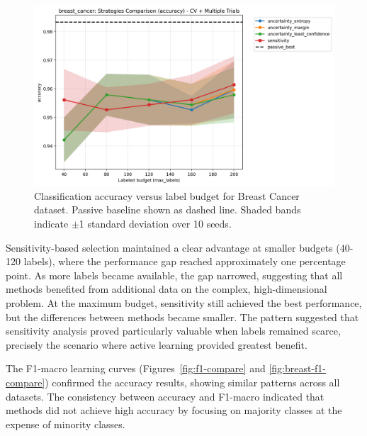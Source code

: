 \documentclass[conference]{IEEEtran}
\begin{document}
\begin{figure}[t]
\centering
\includegraphics[width=0.95\columnwidth]{figures/cls_breast_cancer_comparison_accuracy.png}
\caption{Classification accuracy versus label budget for Breast Cancer dataset. Passive baseline shown as dashed line. Shaded bands indicate $\pm$1 standard deviation over 10 seeds.}
\label{fig:breast-compare}
\end{figure}

Sensitivity-based selection maintained a clear advantage at smaller budgets (40-120 labels), where the performance gap reached approximately one percentage point. As more labels became available, the gap narrowed, suggesting that all methods benefited from additional data on the complex, high-dimensional problem. At the maximum budget, sensitivity still achieved the best performance, but the differences between methods became smaller. The pattern suggested that sensitivity analysis proved particularly valuable when labels remained scarce, precisely the scenario where active learning provided greatest benefit.

The F1-macro learning curves (Figures~\ref{fig:f1-compare} and \ref{fig:breast-f1-compare}) confirmed the accuracy results, showing similar patterns across all datasets. The consistency between accuracy and F1-macro indicated that methods did not achieve high accuracy by focusing on majority classes at the expense of minority classes.
\end{document}
